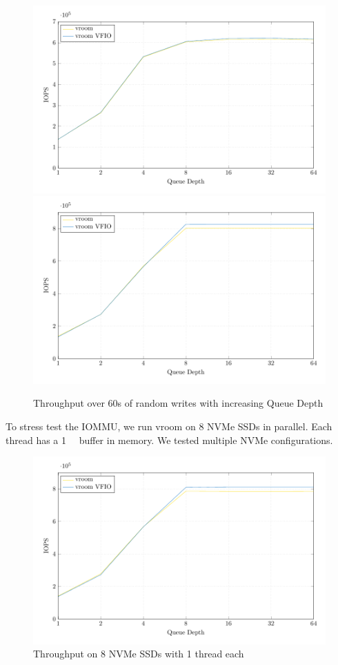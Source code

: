 \begin{figure}[H]
  \centering
   {\includegraphics[width=.8\textwidth]{figures/qdnt1_2MiB} \label{fig:qdnt1-2MiB-intel}}
   {\includegraphics[width=.8\textwidth]{figures/qdnt1_2MiB_epyc} \label{fig:qdnt1-2MiB-epyc}}
  \caption{Throughput over 60s of random writes with increasing Queue Depth}
  \label{fig:qdnt1-2MiB}
\end{figure}

To stress test the IOMMU, we run vroom on 8 NVMe SSDs in parallel. Each thread has a \qty{1}{\gibi\byte} buffer in memory. We tested multiple NVMe configurations.

\begin{figure}[H]
  \centering
  \includegraphics[width=\textwidth]{figures/qdnt1_2MiB_8nvmes}
  \caption{Throughput on 8 NVMe SSDs with 1 thread each}
  \label{fig:8nvmes}
\end{figure}

